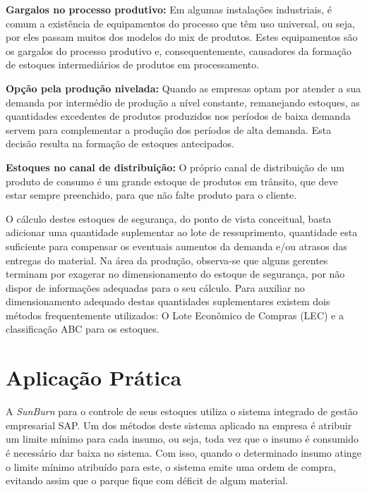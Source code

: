 \textbf{Gargalos no processo produtivo:} Em algumas instalações industriais, é comum a existência de equipamentos do processo que têm uso universal, ou seja, por eles passam muitos dos modelos do mix de produtos. Estes equipamentos são os gargalos do processo produtivo e, consequentemente, causadores da formação de estoques intermediários de produtos em processamento. 

\textbf{Opção pela produção nivelada:} Quando as empresas optam por atender a sua demanda por intermédio de produção a nível constante, remanejando estoques, as quantidades excedentes de produtos produzidos nos períodos de baixa demanda servem para complementar a produção dos períodos de alta demanda. Esta decisão resulta na formação de estoques antecipados.

\textbf{Estoques no canal de distribuição:} O próprio canal de distribuição de um produto de consumo é um grande estoque de produtos em trânsito, que deve estar sempre preenchido, para que não falte produto para o cliente.


O cálculo destes estoques de segurança, do ponto de vista conceitual, basta adicionar uma quantidade suplementar ao lote de ressuprimento, quantidade esta suficiente para compensar os eventuais aumentos da demanda e/ou atrasos das entregas do material. Na área da produção, observa-se que alguns gerentes terminam por exagerar no dimensionamento do estoque de segurança, por não dispor de informações adequadas para o seu cálculo. Para auxiliar no dimensionamento adequado destas quantidades suplementares existem dois métodos frequentemente utilizados: O Lote Econômico de Compras (LEC) e a classificação ABC para os estoques.

\section{Aplicação Prática}
\label{sec:controle_estoques_aplicacao}
A \textit{SunBurn} para o controle de seus estoques utiliza o sistema integrado de gestão empresarial \ac{SAP}. Um dos métodos deste sistema aplicado na empresa é atribuir um limite mínimo para cada insumo, ou seja, toda vez que o insumo é consumido é necessário dar baixa no sistema. Com isso, quando o determinado insumo atinge o limite mínimo atribuído para este, o sistema emite uma ordem de compra, evitando assim que o parque fique com déficit de algum material.

  

